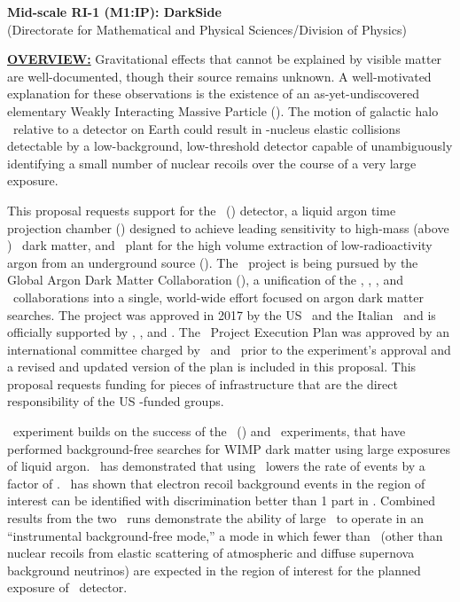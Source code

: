 \label{sec:ProjectSummary}

\begin{center}
{\bf Mid-scale RI-1 (M1:IP): DarkSide} \\
(Directorate for Mathematical and Physical Sciences/Division of Physics)
\end{center}
\vspace*{-3.5mm}
{\underline {\bf OVERVIEW:}}
Gravitational effects that cannot be explained by visible matter are well-documented, though their source remains unknown.  A well-motivated explanation for these observations is the existence of an as-yet-undiscovered elementary Weakly Interacting Massive Particle (\WIMP).  The motion of galactic halo \WIMPs\ relative to a detector on Earth could result in \WIMP-nucleus elastic collisions detectable by a low-background, low-threshold detector capable of unambiguously identifying a small number of nuclear recoils over the course of a very large exposure.

This proposal requests support for the \DSk\ (\DSks) detector, a liquid argon time projection chamber (\LArTPC) designed to achieve leading sensitivity to high-mass (above \DSkHighMassThreshold) \WIMP\ dark matter, and \Urania\ plant  for the high volume extraction of low-radioactivity argon from an underground source (\UAr). The \DSk\ project is being pursued by the Global Argon Dark Matter Collaboration (\GADMC), a unification of the \DS, \DEAP, \mCLEAN, and \ArDM\ collaborations into a single, world-wide effort focused on argon dark matter searches. The project was approved in 2017 by the US \NSF\ and the Italian \INFN\ and is officially supported by \LNGS, \LSC, and \SNOLAB.  The \DSks\ Project Execution Plan was approved by an international committee charged by \INFN\ and \NSF\ prior to the experiment's approval and a revised and updated version of the plan is included in this proposal. This proposal requests funding for pieces of infrastructure that are the direct responsibility of the US \NSF-funded groups. 

\DSks\ experiment builds on the success of the \DSf\ (\DSfs) and \DEAP\ experiments, that have performed background-free searches for WIMP dark matter using large exposures of liquid argon.  \DSfs\ has demonstrated that using \UAr\ lowers the rate of  events by a factor of \DSkDArThreeNineDepletion. \DEAP\ has shown that electron recoil background events in the region of interest can be identified with discrimination better than 1 part in \DEAPPSDRejection. Combined results from the two \DSfs\ runs demonstrate the ability of large \LArTPCs\ to operate in an ``instrumental background-free  mode,'' a mode in which fewer than \BackgroundFreeRequirement\ (other than nuclear recoils from elastic scattering of atmospheric and diffuse supernova background neutrinos) are expected in the region of interest for the planned exposure of \DSks\ detector.

